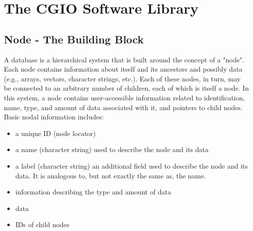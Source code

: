 \section{The CGIO Software Library}
\label{s:library}
\thispagestyle{plain}

\subsection{Node - The Building Block}
\label{s:nodebb}

A database is a hierarchical system that is built around
the concept of a "node".
Each node contains information about itself and its ancestors and
possibly data (e.g., arrays, vectors, character strings, etc.).
Each of these nodes, in turn, may be connected to an arbitrary number of
children, each of which is itself a node.
In this system, a node contains user-accessible information related
to identification, name, type, and amount of data associated with it,
and pointers to child nodes.
Basic nodal information includes:

\begin{itemize}
\item a unique ID (node locator)
\item a name (character string) used to describe the node and its data
\item a label (character string) an additional field used to describe the
      node and its data.
      It is analogous to, but not exactly the same as, the name.
\item information describing the type and amount of data
\item data
\item IDs of child nodes
\end{itemize}

